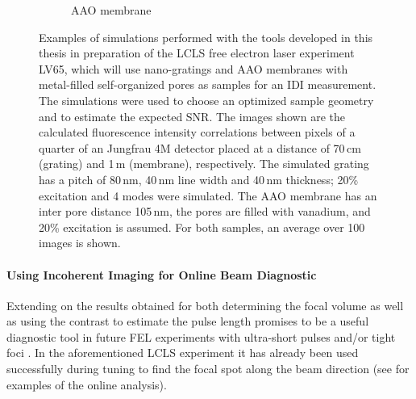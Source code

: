 \begin{figure}[p]
\begin{subfigure}[b]{0.37\textwidth}
		\caption{AAO membrane  }
		\label{fig:outlook_aao}
	\end{subfigure}
	\caption[Simulations in preparation of LV65 Experiment]{Examples of simulations performed with the tools developed in this thesis in preparation of the LCLS free electron laser experiment LV65, which will use nano-gratings and AAO membranes with metal-filled self-organized pores as samples for an IDI measurement. The simulations were used to choose an optimized sample geometry and to estimate the expected SNR. The images shown are the calculated fluorescence intensity correlations between pixels of a quarter of an Jungfrau 4M detector placed at a distance of 70\,cm (grating) and 1\,m (membrane), respectively. The simulated grating has a pitch of 80\,nm, 40\,nm line width and 40\,nm thickness; 20\% excitation and 4 modes were simulated. The AAO membrane has an inter pore distance 105\,nm, the pores are filled with vanadium, and 20\% excitation is assumed. For both samples, an average over 100 images is shown.}
\end{figure}


\paragraph{Using Incoherent Imaging for Online Beam Diagnostic}
Extending on the results obtained for both determining the focal volume as well as using the contrast to estimate the pulse length promises to be a useful diagnostic tool in future FEL experiments with ultra-short pulses and/or tight foci \cite{nakumura2020,inoue2019}. In the aforementioned LCLS experiment it has already been used successfully during tuning to find the focal spot along the beam direction (see  for examples of the online analysis).


